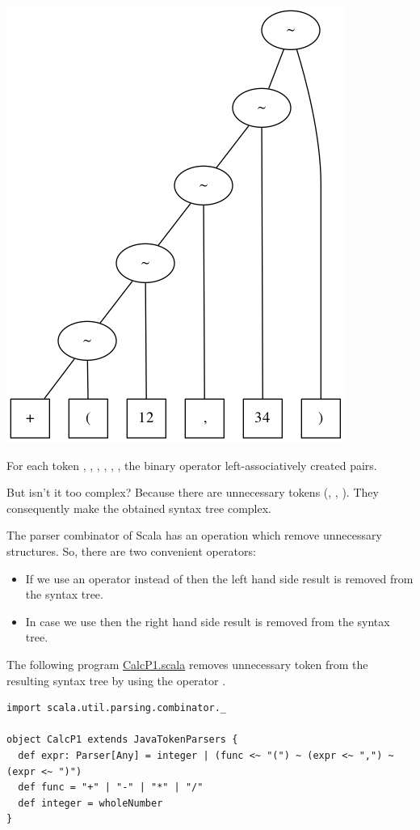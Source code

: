 \documentclass[11pt]{article}
\begin{document}
\includegraphics[width=.9\linewidth]{images/scala-parse-tree1.png}

For each token 
, 
, 
, 
, 
, 
, 
the binary operator  left-associatively created pairs.

But isn't it too complex? 
Because there are unnecessary tokens (, ,
). 
They consequently make the obtained syntax tree complex. 

The parser combinator of Scala has an operation which remove
unnecessary structures. 
So, there are two convenient operators: 
\begin{itemize}
\item If we use an operator  instead of 
    then the left hand side result is removed from the syntax tree.
\item In case we use  then the right hand side result is
removed from the syntax tree.
\end{itemize}

The following program \href{prog/parser/CalcP1.scala}{CalcP1.scala} removes unnecessary token from the
resulting syntax tree by using the operator . 
\begin{verbatim}
import scala.util.parsing.combinator._

object CalcP1 extends JavaTokenParsers {
  def expr: Parser[Any] = integer | (func <~ "(") ~ (expr <~ ",") ~ (expr <~ ")")
  def func = "+" | "-" | "*" | "/"
  def integer = wholeNumber
}
\end{verbatim}
\end{document}
